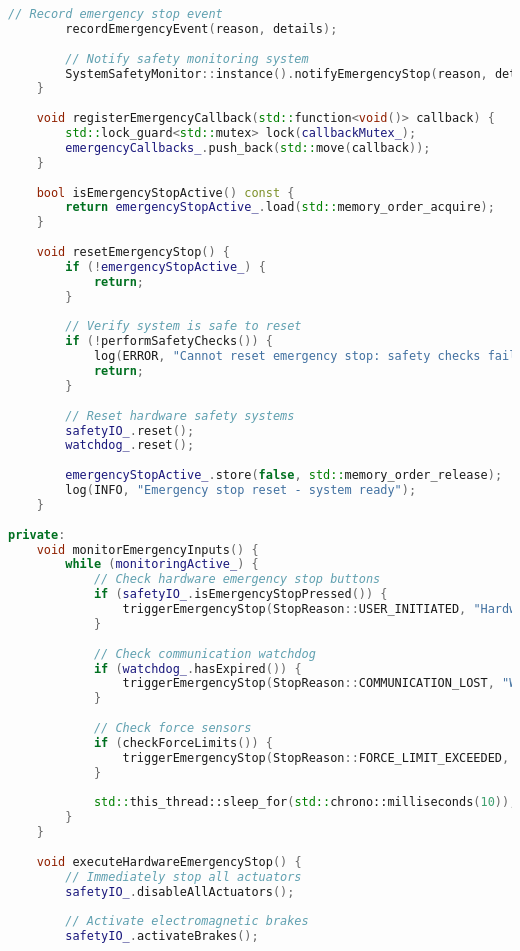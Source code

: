 \begin{lstlisting}[language=C++, caption=Emergency Stop Implementation]
        // Record emergency stop event
        recordEmergencyEvent(reason, details);
        
        // Notify safety monitoring system
        SystemSafetyMonitor::instance().notifyEmergencyStop(reason, details);
    }
    
    void registerEmergencyCallback(std::function<void()> callback) {
        std::lock_guard<std::mutex> lock(callbackMutex_);
        emergencyCallbacks_.push_back(std::move(callback));
    }
    
    bool isEmergencyStopActive() const {
        return emergencyStopActive_.load(std::memory_order_acquire);
    }
    
    void resetEmergencyStop() {
        if (!emergencyStopActive_) {
            return;
        }
        
        // Verify system is safe to reset
        if (!performSafetyChecks()) {
            log(ERROR, "Cannot reset emergency stop: safety checks failed");
            return;
        }
        
        // Reset hardware safety systems
        safetyIO_.reset();
        watchdog_.reset();
        
        emergencyStopActive_.store(false, std::memory_order_release);
        log(INFO, "Emergency stop reset - system ready");
    }
    
private:
    void monitorEmergencyInputs() {
        while (monitoringActive_) {
            // Check hardware emergency stop buttons
            if (safetyIO_.isEmergencyStopPressed()) {
                triggerEmergencyStop(StopReason::USER_INITIATED, "Hardware E-Stop");
            }
            
            // Check communication watchdog
            if (watchdog_.hasExpired()) {
                triggerEmergencyStop(StopReason::COMMUNICATION_LOST, "Watchdog timeout");
            }
            
            // Check force sensors
            if (checkForceLimits()) {
                triggerEmergencyStop(StopReason::FORCE_LIMIT_EXCEEDED, "Force threshold exceeded");
            }
            
            std::this_thread::sleep_for(std::chrono::milliseconds(10));
        }
    }
    
    void executeHardwareEmergencyStop() {
        // Immediately stop all actuators
        safetyIO_.disableAllActuators();
        
        // Activate electromagnetic brakes
        safetyIO_.activateBrakes();
        

\end{lstlisting}
